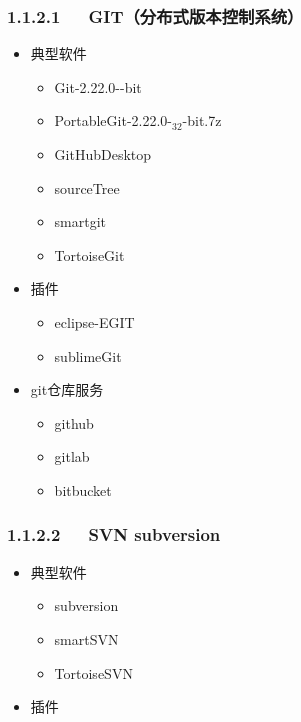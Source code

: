 \documentclass[letterpaper,12pt,english]{sphinxmanual}
\begin{document}
\subsubsection{1.1.2.1   GIT（分布式版本控制系统）}
\label{\detokenize{001software/001install/_u7248_u672c_u63a7_u5236_u8f6f_u4ef6:git}}\begin{itemize}
\item {} 
典型软件
\begin{itemize}
\item {} 
Git-2.22.0--bit

\item {} 
PortableGit-2.22.0-$_{\text{32}}$-bit.7z

\item {} 
GitHubDesktop

\item {} 
sourceTree

\item {} 
smartgit

\item {} 
TortoiseGit

\end{itemize}

\item {} 
插件
\begin{itemize}
\item {} 
eclipse-EGIT

\item {} 
sublimeGit

\end{itemize}

\item {} 
git仓库服务
\begin{itemize}
\item {} 
github

\item {} 
gitlab

\item {} 
bitbucket

\end{itemize}

\end{itemize}


\subsubsection{1.1.2.2   SVN subversion}
\label{\detokenize{001software/001install/_u7248_u672c_u63a7_u5236_u8f6f_u4ef6:svn-subversion}}\begin{itemize}
\item {} 
典型软件
\begin{itemize}
\item {} 
subversion

\item {} 
smartSVN

\item {} 
TortoiseSVN

\end{itemize}

\item {} 
插件

\end{itemize}
\end{document}
